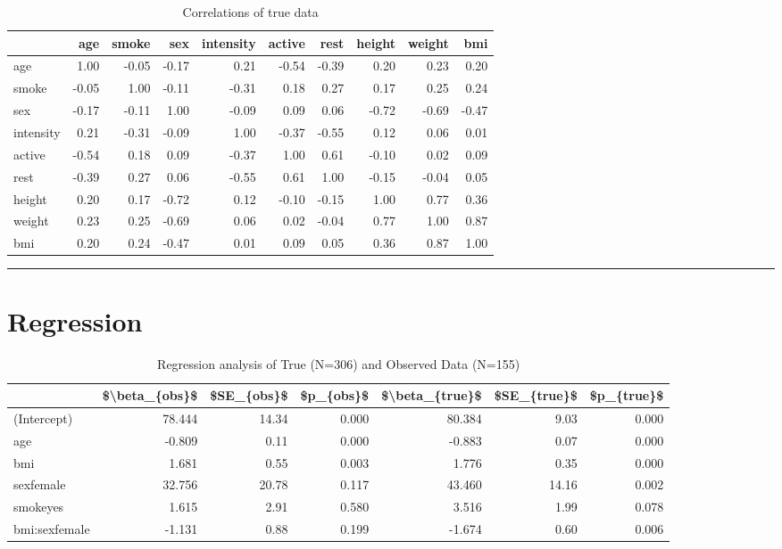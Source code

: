 \documentclass[
]{article}
\begin{document}
\begin{table}

\caption{\label{tab:corTrue}Correlations of true data}
\centering
\begin{tabular}[t]{l|r|r|r|r|r|r|r|r|r}
\hline
  & age & smoke & sex & intensity & active & rest & height & weight & bmi\\
\hline
age & 1.00 & -0.05 & -0.17 & 0.21 & -0.54 & -0.39 & 0.20 & 0.23 & 0.20\\
\hline
smoke & -0.05 & 1.00 & -0.11 & -0.31 & 0.18 & 0.27 & 0.17 & 0.25 & 0.24\\
\hline
sex & -0.17 & -0.11 & 1.00 & -0.09 & 0.09 & 0.06 & -0.72 & -0.69 & -0.47\\
\hline
intensity & 0.21 & -0.31 & -0.09 & 1.00 & -0.37 & -0.55 & 0.12 & 0.06 & 0.01\\
\hline
active & -0.54 & 0.18 & 0.09 & -0.37 & 1.00 & 0.61 & -0.10 & 0.02 & 0.09\\
\hline
rest & -0.39 & 0.27 & 0.06 & -0.55 & 0.61 & 1.00 & -0.15 & -0.04 & 0.05\\
\hline
height & 0.20 & 0.17 & -0.72 & 0.12 & -0.10 & -0.15 & 1.00 & 0.77 & 0.36\\
\hline
weight & 0.23 & 0.25 & -0.69 & 0.06 & 0.02 & -0.04 & 0.77 & 1.00 & 0.87\\
\hline
bmi & 0.20 & 0.24 & -0.47 & 0.01 & 0.09 & 0.05 & 0.36 & 0.87 & 1.00\\
\hline
\end{tabular}
\end{table}

\begin{center}\rule{0.5\linewidth}{0.5pt}\end{center}

\hypertarget{data4}{%
\section{Regression}\label{data4}}

\begin{table}

\caption{\label{tab:reg}Regression analysis of True (N=306) and Observed Data (N=155)}
\centering
\begin{tabular}[t]{l|r|r|r|r|r|r}
\hline
  & \$\textbackslash{}beta\_\{obs\}\$ & \$SE\_\{obs\}\$ & \$p\_\{obs\}\$ & \$\textbackslash{}beta\_\{true\}\$ & \$SE\_\{true\}\$ & \$p\_\{true\}\$\\
\hline
(Intercept) & 78.444 & 14.34 & 0.000 & 80.384 & 9.03 & 0.000\\
\hline
age & -0.809 & 0.11 & 0.000 & -0.883 & 0.07 & 0.000\\
\hline
bmi & 1.681 & 0.55 & 0.003 & 1.776 & 0.35 & 0.000\\
\hline
sexfemale & 32.756 & 20.78 & 0.117 & 43.460 & 14.16 & 0.002\\
\hline
smokeyes & 1.615 & 2.91 & 0.580 & 3.516 & 1.99 & 0.078\\
\hline
bmi:sexfemale & -1.131 & 0.88 & 0.199 & -1.674 & 0.60 & 0.006\\
\hline
\end{tabular}
\end{table}
\end{document}
